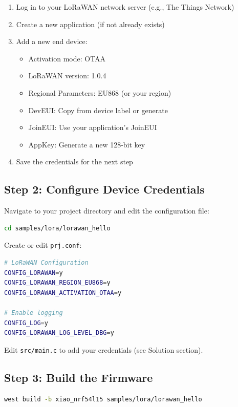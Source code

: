 \documentclass[11pt,a4paper]{article}
\begin{document}
\begin{enumerate}
    \item Log in to your LoRaWAN network server (e.g., The Things Network)
    \item Create a new application (if not already exists)
    \item Add a new end device:
    \begin{itemize}
        \item Activation mode: OTAA
        \item LoRaWAN version: 1.0.4
        \item Regional Parameters: EU868 (or your region)
        \item DevEUI: Copy from device label or generate
        \item JoinEUI: Use your application's JoinEUI
        \item AppKey: Generate a new 128-bit key
    \end{itemize}
    \item Save the credentials for the next step
\end{enumerate}

\subsection{Step 2: Configure Device Credentials}

Navigate to your project directory and edit the configuration file:

\begin{lstlisting}[language=bash]
cd samples/lora/lorawan_hello
\end{lstlisting}

Create or edit \texttt{prj.conf}:

\begin{lstlisting}[language=bash]
# LoRaWAN Configuration
CONFIG_LORAWAN=y
CONFIG_LORAWAN_REGION_EU868=y
CONFIG_LORAWAN_ACTIVATION_OTAA=y

# Enable logging
CONFIG_LOG=y
CONFIG_LORAWAN_LOG_LEVEL_DBG=y
\end{lstlisting}

Edit \texttt{src/main.c} to add your credentials (see Solution section).

\subsection{Step 3: Build the Firmware}

\begin{lstlisting}[language=bash]
west build -b xiao_nrf54l15 samples/lora/lorawan_hello
\end{lstlisting}
\end{document}
